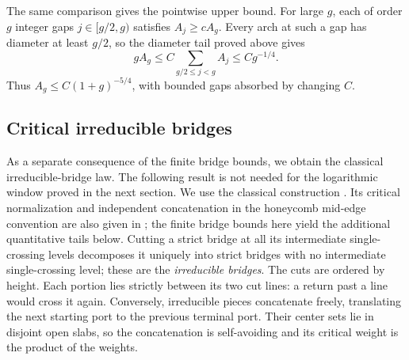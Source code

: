 \documentclass[11pt]{article}
\numberwithin{equation}{section}
\theoremstyle{definition}\newtheorem{definition}[theorem]{Definition}
\theoremstyle{remark}\newtheorem{remark}[theorem]{Remark}
\begin{document}
The same comparison gives the pointwise upper bound. For large $g$,
each of order $g$ integer gaps $j\in[g/2,g)$ satisfies $A_j\ge cA_g$.
Every arch at such a gap has diameter at least $g/2$, so the diameter
tail proved above gives
\[
 gA_g\le C\sum_{g/2\le j<g}A_j\le Cg^{-1/4}.
\]
Thus $A_g\le C(1+g)^{-5/4}$, with bounded gaps absorbed by changing $C$.

\subsection{Critical irreducible bridges}\label{L:step17}

As a separate consequence of the finite bridge bounds, we obtain the
classical irreducible-bridge law. The following result is not needed for
the logarithmic window proved in the next section. We use the classical
construction \cite{Kesten1963,MadrasSlade1993}. Its critical normalization
and independent concatenation in the honeycomb mid-edge convention are
also given in \cite[Appendix]{BeatonEtAl2014}; the finite bridge bounds
here yield the additional quantitative tails below.
Cutting a strict bridge at all its intermediate single-crossing levels
decomposes it uniquely into strict bridges with no intermediate
single-crossing level; these are the \emph{irreducible bridges}. The cuts are ordered by height.
Each portion lies strictly between its two cut lines: a return past a
line would cross it again. Conversely, irreducible pieces concatenate
freely, translating the next starting port to the previous terminal
port. Their center sets lie in disjoint open slabs, so the concatenation
is self-avoiding and its critical weight is the product of the weights.
\end{document}
